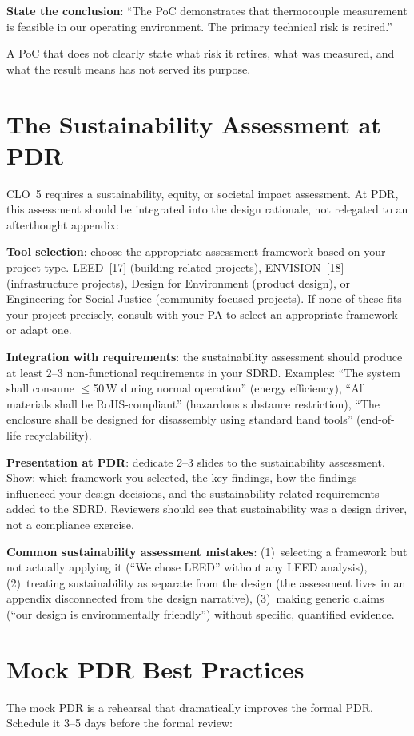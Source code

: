 \textbf{State the conclusion}: ``The PoC demonstrates that thermocouple measurement is feasible in our operating environment. The primary technical risk is retired.''

A PoC that does not clearly state what risk it retires, what was measured, and what the result means has not served its purpose.



\section{The Sustainability Assessment at PDR}
CLO~5 requires a sustainability, equity, or societal impact assessment. At PDR, this assessment should be integrated into the design rationale, not relegated to an afterthought appendix:

\textbf{Tool selection}: choose the appropriate assessment framework based on your project type. LEED~[17] (building-related projects), ENVISION~[18] (infrastructure projects), Design for Environment (product design), or Engineering for Social Justice (community-focused projects). If none of these fits your project precisely, consult with your PA to select an appropriate framework or adapt one.

\textbf{Integration with requirements}: the sustainability assessment should produce at least 2--3 non-functional requirements in your SDRD. Examples: ``The system shall consume $\leq$50\,W during normal operation'' (energy efficiency), ``All materials shall be RoHS-compliant'' (hazardous substance restriction), ``The enclosure shall be designed for disassembly using standard hand tools'' (end-of-life recyclability).

\textbf{Presentation at PDR}: dedicate 2--3 slides to the sustainability assessment. Show: which framework you selected, the key findings, how the findings influenced your design decisions, and the sustainability-related requirements added to the SDRD. Reviewers should see that sustainability was a design driver, not a compliance exercise.

\textbf{Common sustainability assessment mistakes}: (1)~selecting a framework but not actually applying it (``We chose LEED'' without any LEED analysis), (2)~treating sustainability as separate from the design (the assessment lives in an appendix disconnected from the design narrative), (3)~making generic claims (``our design is environmentally friendly'') without specific, quantified evidence.

\section{Mock PDR Best Practices}
The mock PDR is a rehearsal that dramatically improves the formal PDR. Schedule it 3--5 days before the formal review:

